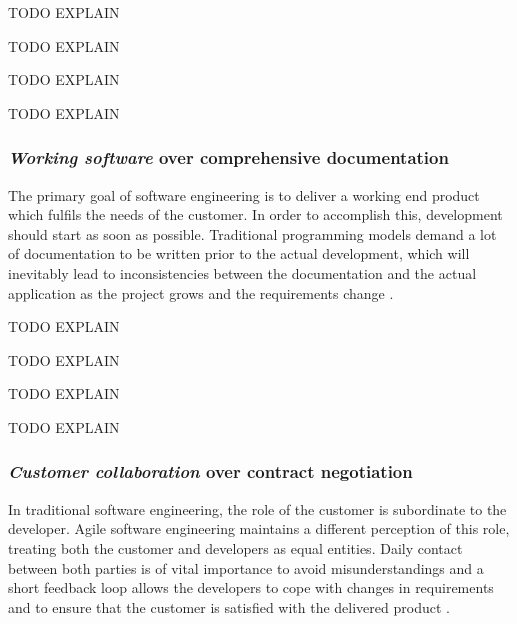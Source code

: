 TODO EXPLAIN

TODO EXPLAIN

TODO EXPLAIN

TODO EXPLAIN

\subsubsection{\emph{Working software} over comprehensive documentation}
The primary goal of software engineering is to deliver a working end product which fulfils the needs of the customer. In order to accomplish this, development should start as soon as possible. Traditional programming models demand a lot of documentation to be written prior to the actual development, which will inevitably lead to inconsistencies between the documentation and the actual application as the project grows and the requirements change \cite{Hazzan2014}. 
	
TODO EXPLAIN

TODO EXPLAIN

TODO EXPLAIN

TODO EXPLAIN

\subsubsection{\emph{Customer collaboration} over contract negotiation}
In traditional software engineering, the role of the customer is subordinate to the developer. Agile software engineering maintains a different perception of this role, treating both the customer and developers as equal entities. Daily contact between both parties is of vital importance to avoid misunderstandings and a short feedback loop allows the developers to cope with changes in requirements and to ensure that the customer is satisfied with the delivered product \cite{Hazzan2014}.

